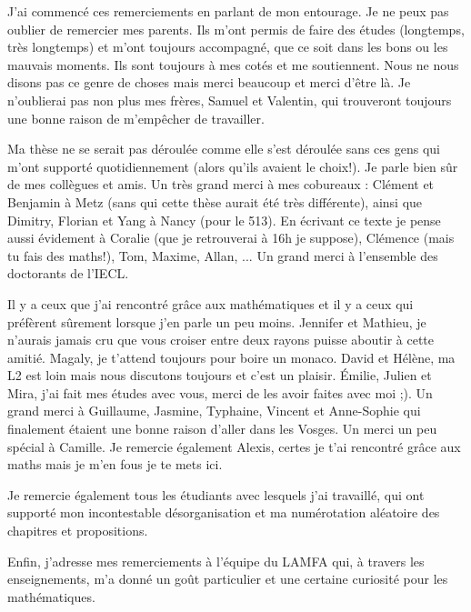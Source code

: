 J'ai commencé ces remerciements en parlant de mon entourage. Je ne peux pas oublier de remercier mes parents. Ils m'ont permis de faire des études (longtemps, très longtemps) et m'ont toujours accompagné, que ce soit dans les bons ou les mauvais moments. Ils sont toujours à mes cotés et me soutiennent. Nous ne nous disons pas ce genre de choses mais merci beaucoup et merci d'être là. Je n'oublierai pas non plus mes frères, Samuel et Valentin, qui trouveront toujours une bonne raison de m'empêcher de travailler.
\vspace{.6cm}

Ma thèse ne se serait pas déroulée comme elle s'est déroulée sans ces gens qui m'ont supporté quotidiennement (alors qu'ils avaient le choix!). Je parle bien sûr de mes collègues et amis. Un très grand merci à mes cobureaux : Clément et Benjamin à Metz (sans qui cette thèse aurait été très différente), ainsi que Dimitry, Florian et Yang à Nancy (pour le 513). En écrivant ce texte je pense aussi évidement à Coralie (que je retrouverai à 16h je suppose), Clémence (mais tu fais des maths!), Tom, Maxime, Allan, ... Un grand merci à l'ensemble des doctorants de l'IECL. 
\vspace{.6cm}

Il y a ceux que j'ai rencontré grâce aux mathématiques et il y a ceux qui préfèrent sûrement lorsque j'en parle un peu moins. Jennifer et Mathieu, je n'aurais jamais cru que vous croiser entre deux rayons puisse aboutir à cette amitié. Magaly, je t'attend toujours pour boire un monaco. David et Hélène, ma L2 est loin mais nous discutons toujours et c'est un plaisir. Émilie, Julien et Mira, j'ai fait mes études avec vous, merci de les avoir faites avec moi ;). Un grand merci à Guillaume, Jasmine, Typhaine, Vincent et Anne-Sophie qui finalement étaient une bonne raison d'aller dans les Vosges. Un merci un peu spécial à Camille. Je remercie également Alexis, certes je t'ai rencontré grâce aux maths mais je m'en fous je te mets ici.
\vspace{.6cm}

Je remercie également tous les étudiants avec lesquels j'ai travaillé, qui ont supporté mon incontestable désorganisation et ma numérotation aléatoire des chapitres et propositions.
\vspace{.6cm}

Enfin, j'adresse mes remerciements à l'équipe du LAMFA qui, à travers les enseignements, m'a donné un goût particulier et une certaine curiosité pour les mathématiques.
\vspace{.6cm}









